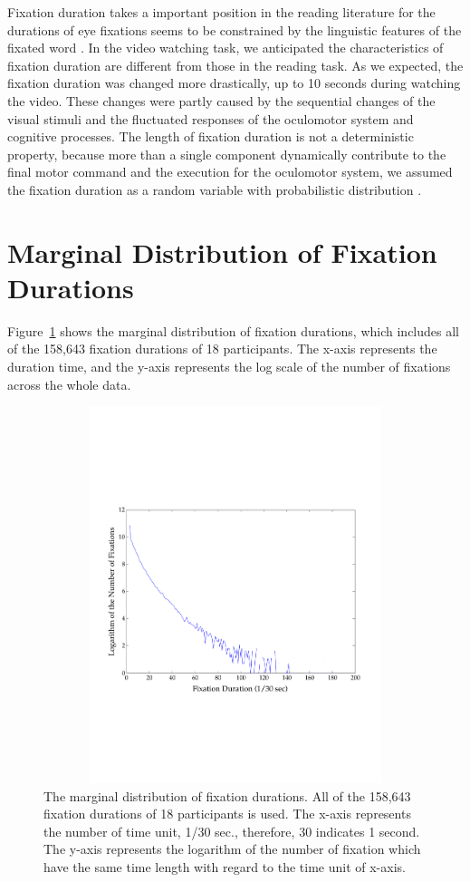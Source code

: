 \documentclass[oneside,master]{snueethesis}
\begin{document}
Fixation duration takes a important position in the reading literature for the durations of eye fixations seems to be constrained by the linguistic features of the fixated word \cite{Rayner1986,Inhoff1986}. In the video watching task, we anticipated the characteristics of fixation duration are different from those in the reading task. As we expected, the fixation duration was changed more drastically, up to 10 seconds during watching the video. These changes were partly caused by the sequential changes of the visual stimuli and the fluctuated responses of the oculomotor system and cognitive processes. The length of fixation duration is not a deterministic property, because more than a single component dynamically contribute to the final motor command and the execution for the oculomotor system, we assumed the fixation duration as a random variable with probabilistic distribution \cite{Rayner1998,Reichle2004,Reichle2006}.


\section{Marginal Distribution of Fixation Durations}

Figure~\ref{fig:marginal-fixation-duration} shows the marginal distribution of fixation durations, which includes all of the 158,643 fixation durations of 18 participants. The x-axis represents the duration time, and the y-axis represents the log scale of the number of fixations across the whole data.

\begin{figure}
  \centerline{\includegraphics[width=150mm,height=110mm,trim=0mm 60mm 0mm 60mm]{./eps/marginal_fixation_duration.pdf}}
  \caption[The marginal distribution of fixation durations]{The marginal distribution of fixation durations. All of the 158,643 fixation durations of 18 participants is used. The x-axis represents the number of time unit, 1/30 sec., therefore, 30 indicates 1 second. The y-axis represents the logarithm of the number of fixation which have the same time length with regard to the time unit of x-axis.}
  \label{fig:marginal-fixation-duration}
\end{figure}
\end{document}
